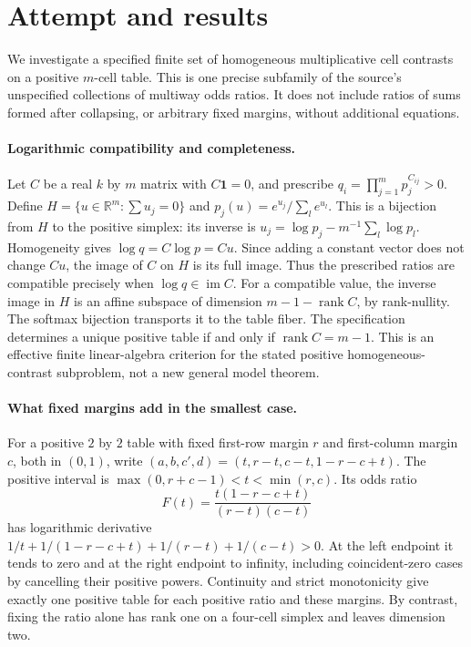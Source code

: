 \documentclass[11pt]{article}
\begin{document}
\section{Attempt and results}
We investigate a specified finite set of homogeneous multiplicative
cell contrasts on a positive $m$-cell table. This is one precise subfamily
of the source's unspecified collections of multiway odds ratios. It does
not include ratios of sums formed after collapsing, or arbitrary fixed
margins, without additional equations.

\paragraph{Logarithmic compatibility and completeness.}
Let $C$ be a real $k$ by $m$ matrix with $C\boldsymbol1=0$, and prescribe
$q_i=\prod_{j=1}^m p_j^{C_{ij}}>0$. Define
$H=\{u\in\mathbb R^m:\sum u_j=0\}$ and
$p_j(u)=e^{u_j}/\sum_l e^{u_l}$. This is a bijection from $H$ to the
positive simplex: its inverse is
$u_j=\log p_j-m^{-1}\sum_l\log p_l$.
Homogeneity gives $\log q=C\log p=Cu$. Since adding a constant vector
does not change $Cu$, the image of $C$ on $H$ is its full image. Thus
the prescribed ratios are compatible precisely when $\log q\in\operatorname{im}C$.
For a compatible value, the inverse image in $H$ is an affine subspace
of dimension $m-1-\operatorname{rank}C$, by rank-nullity.
The softmax bijection transports it to the table fiber. The specification
determines a unique positive table if and only if $\operatorname{rank}C=m-1$.
This is an effective finite linear-algebra criterion for the stated
positive homogeneous-contrast subproblem, not a new general model theorem.

\paragraph{What fixed margins add in the smallest case.}
For a positive $2$ by $2$ table with fixed first-row margin $r$ and
first-column margin $c$, both in $(0,1)$, write
$(a,b,c',d)=(t,r-t,c-t,1-r-c+t)$.
The positive interval is $\max(0,r+c-1)<t<\min(r,c)$.
Its odds ratio
\[
F(t)=\frac{t(1-r-c+t)}{(r-t)(c-t)}
\]
has logarithmic derivative
$1/t+1/(1-r-c+t)+1/(r-t)+1/(c-t)>0$.
At the left endpoint it tends to zero and at the right endpoint to infinity,
including coincident-zero cases by cancelling their positive powers.
Continuity and strict monotonicity give exactly one positive table for each
positive ratio and these margins. By contrast, fixing the ratio alone has
rank one on a four-cell simplex and leaves dimension two.
\end{document}
